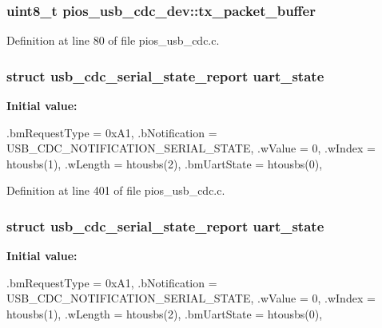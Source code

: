 \hypertarget{group___p_i_o_s___u_s_b___c_o_m_ga1b086465e042517001948516cfa908d1}{
\subsubsection[{tx\-\_\-packet\-\_\-buffer}]{\setlength{\rightskip}{0pt plus 5cm}uint8\-\_\-t {\bf pios\-\_\-usb\-\_\-cdc\-\_\-dev\-::tx\-\_\-packet\-\_\-buffer}}}\label{group___p_i_o_s___u_s_b___c_o_m_ga1b086465e042517001948516cfa908d1}


\-Definition at line 80 of file pios\-\_\-usb\-\_\-cdc.\-c.

\hypertarget{group___p_i_o_s___u_s_b___c_o_m_gaf7f356f1ada9744b2424b2980baa2a81}{
\subsubsection[{uart\-\_\-state}]{\setlength{\rightskip}{0pt plus 5cm}struct {\bf usb\-\_\-cdc\-\_\-serial\-\_\-state\-\_\-report} {\bf uart\-\_\-state}}}\label{group___p_i_o_s___u_s_b___c_o_m_gaf7f356f1ada9744b2424b2980baa2a81}
{\bfseries \-Initial value\-:}
\begin{DoxyCode}
 {
        .bmRequestType = 0xA1,
        .bNotification = USB_CDC_NOTIFICATION_SERIAL_STATE,
        .wValue        = 0,
        .wIndex        = htousbs(1),
        .wLength       = htousbs(2),
        .bmUartState   = htousbs(0),
}
\end{DoxyCode}


\-Definition at line 401 of file pios\-\_\-usb\-\_\-cdc.\-c.

\hypertarget{group___p_i_o_s___u_s_b___c_o_m_gaf7f356f1ada9744b2424b2980baa2a81}{
\subsubsection[{uart\-\_\-state}]{\setlength{\rightskip}{0pt plus 5cm}struct {\bf usb\-\_\-cdc\-\_\-serial\-\_\-state\-\_\-report} {\bf uart\-\_\-state}}}\label{group___p_i_o_s___u_s_b___c_o_m_gaf7f356f1ada9744b2424b2980baa2a81}
{\bfseries \-Initial value\-:}
\begin{DoxyCode}
 {
        .bmRequestType = 0xA1,
        .bNotification = USB_CDC_NOTIFICATION_SERIAL_STATE,
        .wValue        = 0,
        .wIndex        = htousbs(1),
        .wLength       = htousbs(2),
        .bmUartState  = htousbs(0),
}
\end{DoxyCode}


